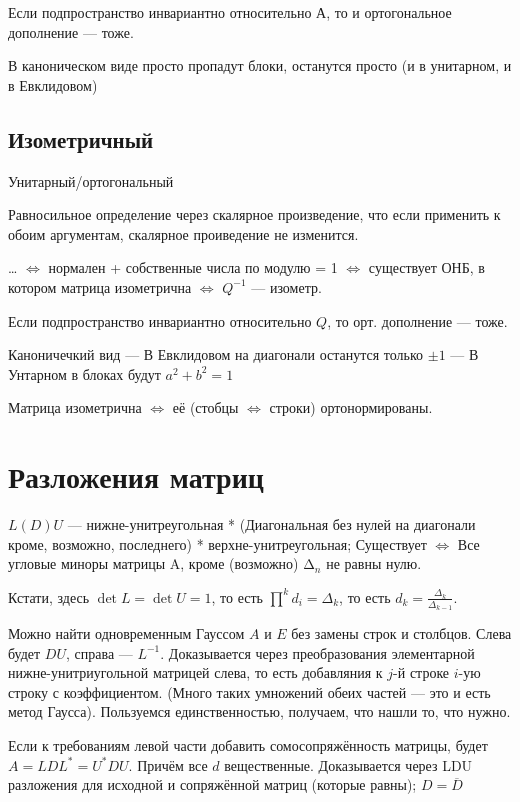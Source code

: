 \documentclass[12pt, a4paper]{article}
\begin{document}
Если подпространство инвариантно относительно А, то и ортогональное дополнение — тоже.

В каноническом виде просто пропадут блоки, останутся просто (и в унитарном, и в Евклидовом)


\subsection{Изометричный}

Унитарный/ортогональный

Равносильное определение через скалярное произведение, что если применить к обоим аргументам, скалярное проиведение не изменится.



…
$\Longleftrightarrow$ нормален + собственные числа по модулю = 1
$\Longleftrightarrow$ существует ОНБ, в котором матрица изометрична
$\Longleftrightarrow$ $Q^{-1}$ — изометр.

Если подпространство инвариантно относительно $Q$, то орт. дополнение — тоже.

Каноничечкий вид
— В Евклидовом на диагонали останутся только $± 1$
— В Унтарном в блоках будут $a^2 + b^2 = 1$

Матрица изометрична $\Longleftrightarrow$ её (стобцы $\Longleftrightarrow$ строки) ортонормированы.


\section{Разложения матриц}

$L(D)U$ — нижне-унитреугольная * (Диагональная без нулей на диагонали кроме, возможно, последнего) * верхне-унитреугольная; 
Существует $\Longleftrightarrow$ Все угловые миноры матрицы A, кроме (возможно) $∆_n$ не равны нулю. 

Кстати, здесь $\det L = \det U = 1$, то есть $\prod^k d_i = \Delta_k$, то есть $d_k = \frac{\Delta_k}{\Delta_{k - 1}}$.

Можно найти одновременным Гауссом $A$ и $E$ без замены строк и столбцов. Слева будет $DU$, справа — $L^{-1}$.
Доказывается через преобразования элементарной нижне-унитриугольной матрицей слева, то есть добавляния к $j$-й строке $i$-ую строку с коэффициентом.
(Много таких умножений обеих частей — это и есть метод Гаусса). Пользуемся единственностью, получаем, что нашли то, что нужно.

Если к требованиям левой части добавить сомосопряжённость матрицы, будет $A = LDL^* = U^*DU$. Причём все $d$ вещественные. 
Доказывается через LDU разложения для исходной и сопряжённой матриц (которые равны); $D = \overline{D}$
\end{document}
